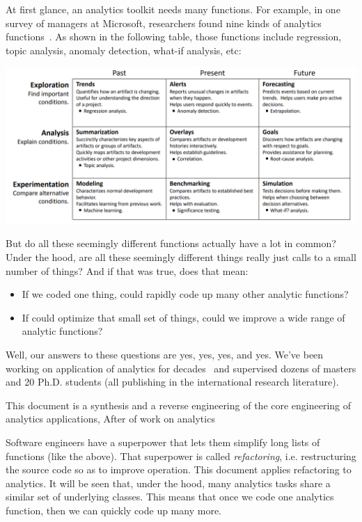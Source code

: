 \documentclass[landscape,	DIV=calc,%
							paper=letter,%
							fontsize=10pt,%
							twocolumn]{scrartcl}	 					%
\begin{document}
At first glance, an analytics toolkit needs many functions.   For example,
in one survey of managers at   Microsoft, 
researchers found nine kinds  of analytics functions~\cite{buse2012information}.
As shown in the following table, those  functions include regression, topic analysis, anomaly detection, what-if analysis,
etc:


\includegraphics[width=\linewidth]{Buse.png} 

But do all these seemingly different functions actually have a lot in common? Under the hood, are all these seemingly
different things
really just calls
to a small number of things?  And if that was true,  does that mean:
\begin{itemize}
    \item
        If we coded one thing, could rapidly code up many other analytic functions?
    \item
If could 
optimize that small set of things,  could we improve a wide range of analytic functions?
\end{itemize}
Well,  our answers to these questions are yes, yes, yes, and yes. 
We've been working on application of analytics for 
decades~\cite{menzies1988combining,menzies1987micro,haynes1996visualisations,
} and supervised
dozens of masters and 20 Ph.D. students 
(all publishing in the international research literature).

This document is a synthesis and a reverse engineering of the core engineering
of analytics applications,
After 
of work on analytics


Software engineers have a superpower that lets them simplify long lists of functions
(like the above). That superpower is called {\em refactoring}, i.e. 
restructuring the source code  so as to improve operation.
This document applies  refactoring to analytics. It will be seen that, under
the hood, many
analytics tasks share a similar set of underlying classes.  This means that
once we code one analytics
function, then we can quickly 
code up many more. 
\end{document}
